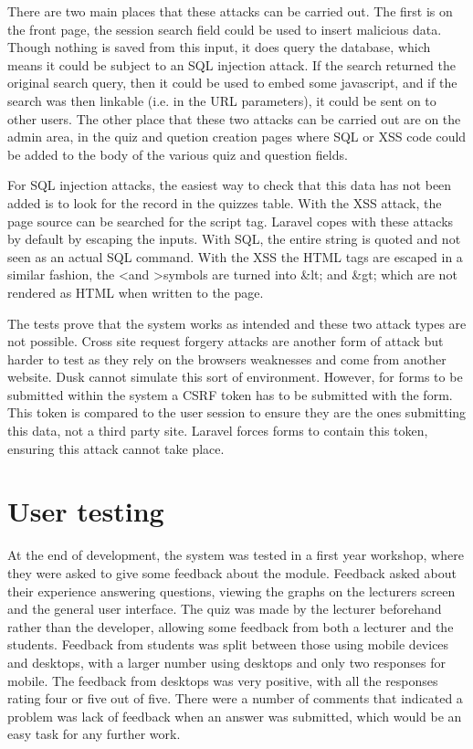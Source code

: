 There are two main places that these attacks can be carried out. The first is on the front page, the session search field could be used to insert malicious data. Though nothing is saved from this input, it does query the database, which means it could be subject to an SQL injection attack. If the search returned the original search query, then it could be used to embed some javascript, and if the search was then linkable (i.e. in the URL parameters), it could be sent on to other users. The other place that these two attacks can be carried out are on the admin area, in the quiz and quetion creation pages where SQL or XSS code could be added to the body of the various quiz and question fields.

For SQL injection attacks, the easiest way to check that this data has not been added is to look for the record in the quizzes table. With the XSS attack, the page source can be searched for the script tag. Laravel copes with these attacks by default by escaping the inputs\cite{laravel-web-attacks}. With SQL, the entire string is quoted and not seen as an actual SQL command. With the XSS the HTML tags are escaped in a similar fashion, the \textless and \textgreater symbols are turned into \&lt; and \&gt; which are not rendered as HTML when written to the page.

The tests prove that the system works as intended and these two attack types are not possible. Cross site request forgery attacks are another form of attack but harder to test as they rely on the browsers weaknesses and come from another website. Dusk cannot simulate this sort of environment. However, for forms to be submitted within the system a CSRF token has to be submitted with the form. This token is compared to the user session to ensure they are the ones submitting this data, not a third party site. Laravel forces forms to contain this token, ensuring this attack cannot take place. 

\section{User testing}
At the end of development, the system was tested in a first year workshop, where they were asked to give some feedback about the module. Feedback asked about their experience answering questions, viewing the graphs on the lecturers screen and the general user interface. The quiz was made by the lecturer beforehand rather than the developer, allowing some feedback from both a lecturer and the students. Feedback from students was split between those using mobile devices and desktops, with a larger number using desktops and only two responses for mobile. The feedback from desktops was very positive, with all the responses rating four or five out of five. There were a number of comments that indicated a problem was lack of feedback when an answer was submitted, which would be an easy task for any further work.

